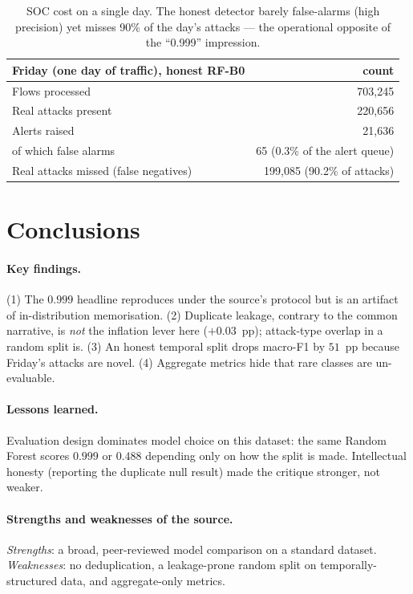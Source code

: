 \documentclass[11pt,a4paper]{article}
\begin{document}
\begin{table}[H]
\centering\small
\begin{tabular}{l r}
\toprule
\textbf{Friday (one day of traffic), honest RF-B0} & \textbf{count}\\
\midrule
Flows processed & 703{,}245\\
Real attacks present & 220{,}656\\
Alerts raised & 21{,}636\\
\quad of which false alarms & 65 \;(0.3\% of the alert queue)\\
Real attacks missed (false negatives) & 199{,}085 \;(90.2\% of attacks)\\
\bottomrule
\end{tabular}
\caption{SOC cost on a single day. The honest detector barely false-alarms (high precision) yet
misses 90\% of the day's attacks --- the operational opposite of the ``0.999'' impression.}
\end{table}

\section{Conclusions}
\paragraph{Key findings.} (1) The $0.999$ headline reproduces under the source's protocol but
is an artifact of in-distribution memorisation. (2) Duplicate leakage, contrary to the common
narrative, is \emph{not} the inflation lever here ($+0.03$~pp); attack-type overlap in a random
split is. (3) An honest temporal split drops macro-F1 by $51$~pp because Friday's attacks are
novel. (4) Aggregate metrics hide that rare classes are un-evaluable.

\paragraph{Lessons learned.} Evaluation design dominates model choice on this dataset:
the same Random Forest scores $0.999$ or $0.488$ depending only on how the split is made.
Intellectual honesty (reporting the duplicate null result) made the critique stronger, not
weaker.

\paragraph{Strengths and weaknesses of the source.} \emph{Strengths}: a broad, peer-reviewed
model comparison on a standard dataset. \emph{Weaknesses}: no deduplication, a leakage-prone
random split on temporally-structured data, and aggregate-only metrics.
\end{document}
